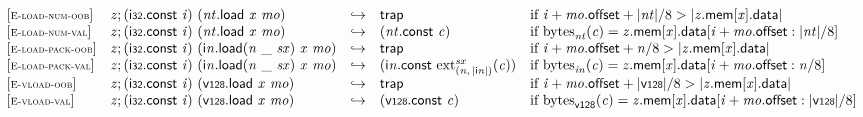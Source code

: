$$
\begin{array}{@{}l@{}lcl@{}l@{}}
{[\textsc{\scriptsize E{-}load{-}num{-}oob}]} \quad & {\mathit{z}} ; (\mathsf{i{\scriptstyle32}}.\mathsf{const}~{\mathit{i}})~({\mathit{nt}}.\mathsf{load}~{\mathit{x}}~{\mathit{mo}}) &\hookrightarrow& \mathsf{trap} &\quad
  \mbox{if}~{\mathit{i}} + {\mathit{mo}}.\mathsf{offset} + {|{\mathit{nt}}|} / 8 > {|{{\mathit{z}}.\mathsf{mem}}{{}[{\mathit{x}}]}.\mathsf{data}|} \\
{[\textsc{\scriptsize E{-}load{-}num{-}val}]} \quad & {\mathit{z}} ; (\mathsf{i{\scriptstyle32}}.\mathsf{const}~{\mathit{i}})~({\mathit{nt}}.\mathsf{load}~{\mathit{x}}~{\mathit{mo}}) &\hookrightarrow& ({\mathit{nt}}.\mathsf{const}~{\mathit{c}}) &\quad
  \mbox{if}~{{\mathrm{bytes}}}_{{\mathit{nt}}}({\mathit{c}}) = {{\mathit{z}}.\mathsf{mem}}{{}[{\mathit{x}}]}.\mathsf{data}{}[{\mathit{i}} + {\mathit{mo}}.\mathsf{offset} : {|{\mathit{nt}}|} / 8] \\
{[\textsc{\scriptsize E{-}load{-}pack{-}oob}]} \quad & {\mathit{z}} ; (\mathsf{i{\scriptstyle32}}.\mathsf{const}~{\mathit{i}})~({{\mathsf{i}}{{\mathit{n}}}.\mathsf{load}}{({\mathit{n}}~\mathsf{\_}~{\mathit{sx}})}~{\mathit{x}}~{\mathit{mo}}) &\hookrightarrow& \mathsf{trap} &\quad
  \mbox{if}~{\mathit{i}} + {\mathit{mo}}.\mathsf{offset} + {\mathit{n}} / 8 > {|{{\mathit{z}}.\mathsf{mem}}{{}[{\mathit{x}}]}.\mathsf{data}|} \\
{[\textsc{\scriptsize E{-}load{-}pack{-}val}]} \quad & {\mathit{z}} ; (\mathsf{i{\scriptstyle32}}.\mathsf{const}~{\mathit{i}})~({{\mathsf{i}}{{\mathit{n}}}.\mathsf{load}}{({\mathit{n}}~\mathsf{\_}~{\mathit{sx}})}~{\mathit{x}}~{\mathit{mo}}) &\hookrightarrow& ({\mathsf{i}}{{\mathit{n}}}.\mathsf{const}~{{{{\mathrm{ext}}}_{({\mathit{n}},\, {|{\mathsf{i}}{{\mathit{n}}}|})}^{{\mathit{sx}}}}}{({\mathit{c}})}) &\quad
  \mbox{if}~{{\mathrm{bytes}}}_{{{\mathit{i}}}{{\mathit{n}}}}({\mathit{c}}) = {{\mathit{z}}.\mathsf{mem}}{{}[{\mathit{x}}]}.\mathsf{data}{}[{\mathit{i}} + {\mathit{mo}}.\mathsf{offset} : {\mathit{n}} / 8] \\
{[\textsc{\scriptsize E{-}vload{-}oob}]} \quad & {\mathit{z}} ; (\mathsf{i{\scriptstyle32}}.\mathsf{const}~{\mathit{i}})~(\mathsf{v{\scriptstyle128}.load}~{\mathit{x}}~{\mathit{mo}}) &\hookrightarrow& \mathsf{trap} &\quad
  \mbox{if}~{\mathit{i}} + {\mathit{mo}}.\mathsf{offset} + {|\mathsf{v{\scriptstyle128}}|} / 8 > {|{{\mathit{z}}.\mathsf{mem}}{{}[{\mathit{x}}]}.\mathsf{data}|} \\
{[\textsc{\scriptsize E{-}vload{-}val}]} \quad & {\mathit{z}} ; (\mathsf{i{\scriptstyle32}}.\mathsf{const}~{\mathit{i}})~(\mathsf{v{\scriptstyle128}.load}~{\mathit{x}}~{\mathit{mo}}) &\hookrightarrow& (\mathsf{v{\scriptstyle128}}.\mathsf{const}~{\mathit{c}}) &\quad
  \mbox{if}~{{\mathrm{bytes}}}_{\mathsf{v{\scriptstyle128}}}({\mathit{c}}) = {{\mathit{z}}.\mathsf{mem}}{{}[{\mathit{x}}]}.\mathsf{data}{}[{\mathit{i}} + {\mathit{mo}}.\mathsf{offset} : {|\mathsf{v{\scriptstyle128}}|} / 8] \\
\end{array}
$$

